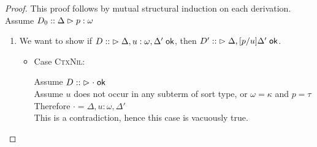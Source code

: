 \begin{proof}
This proof follows by mutual structural induction on each derivation. 
Assume $D_0 :: {\Delta} \vartriangleright {p} : {\omega}$
\begin{enumerate}
\item We want to show if $D  ::\; \vartriangleright {\Delta, u:\omega, \Delta'} \;\mathsf{ok}$, then  
                         $D' ::\; \vartriangleright {\Delta, [p/u]\Delta'} \;\mathsf{ok}$. 
  \begin{itemize}
  \item Case \textsc{CtxNil}: 
    \begin{tabbedproof}
      \oo Assume $D ::\; \vartriangleright {\cdot} \;\mathsf{ok}$ \\
      \oo Assume $u$ does not occur in any subterm of sort type, or $\omega = \kappa$ and $p = \tau$ \\
      \ooo Therefore $\cdot = \Delta, u:\omega, \Delta'$ \\
      \ooo This is a contradiction, hence this case is vacuously true. 
    \end{tabbedproof}


\end{itemize}
\end{enumerate}
\end{proof}
